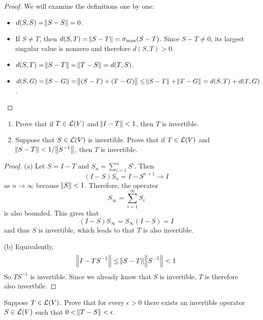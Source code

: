 \documentclass{extarticle}
\begin{document}
\begin{proof}
We will examine the definitions one by one:
\begin{itemize}
    \item \(d(S, S) = \norm{S - S} = 0\).
    \item If \(S \neq T\), then \(d(S, T) 
    = \norm{S - T} = \sigma_{\max}(S - T) \). Since 
    \(S - T \neq 0\), its largest singular value is nonzero
    and therefore \(d(S, T) > 0\). 
    \item \(d(S, T) = \norm{S - T} = \norm{T - S} = 
    d(T, S)\).  
    \item \(d(S, G) = \norm{S - G} 
    = \norm{(S - T) + (T - G)} 
    \leq \norm{S - T} + \norm{T - G} 
    = d(S, T) + d(T, G)\). 
\end{itemize}
\end{proof}

\begin{problem}{8}
    \begin{enumerate}[label=(\alph*)]
        \item Prove that if \(T \in \mathcal{L}(V)\) and 
        \(\norm{I - T} < 1\), then \(T\) is invertible. 
        \item Suppose that \(S \in \mathcal{L}(V)\) is invertible.
        Prove that if \(T \in \mathcal{L}(V)\) and 
        \(\norm{S - T} < 1/\norm{S^{-1}}\), then 
        \(T\) is invertible. 
    \end{enumerate}
\end{problem}

\begin{proof}
(a) Let \(S = I - T\) and \(S_n = \sum_{i=1}^{n} S^{i}\).
Then 
\[(I - S)S_n = I - S^{n+1} \to I\]
as \(n \to \infty\) because \(\norm{S} < 1\). Therefore, the operator 
\[S_\infty = \sum_{i=1}^{\infty} S_i\]
is also bounded. This gives that 
\[(I - S)S_{\infty} = S_{\infty} (I - S) = I\]
and thus \(S\) is invertible, which leads to that \(T\) is also invertible. 

(b) Equivalently, 
\[ \norm{I - TS^{-1}}  \leq \norm{S - T} \norm{S^{-1}} < 1\]
So \(TS^{-1}\) is invertible. Since we already know that 
\(S\) is invertible, \(T\) is therefore also invertbile. 
\end{proof}

\begin{problem}{9}
    Suppose \(T \in \mathcal{L}(V)\). Prove that for every \(\epsilon > 0\)
    there exists an invertible operator \(S \in \mathcal{L}(V)\)
    such that \(0 < \norm{T - S } < \epsilon\).
\end{problem}
\end{document}
